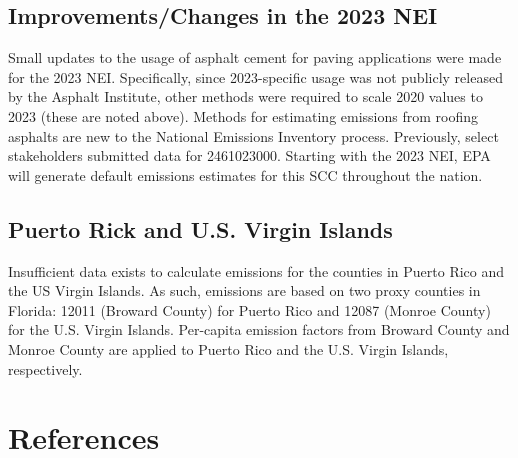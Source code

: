 \documentclass[
  11pt,
  oneside]{book}
\begin{document}
\subsection{Improvements/Changes in the 2023 NEI}\label{improvementschanges-in-the-2023-nei-1}

Small updates to the usage of asphalt cement for paving applications were made for the 2023 NEI. Specifically, since 2023-specific usage was not publicly released by the Asphalt Institute, other methods were required to scale 2020 values to 2023 (these are noted above). Methods for estimating emissions from roofing asphalts are new to the National Emissions Inventory process. Previously, select stakeholders submitted data for 2461023000. Starting with the 2023 NEI, EPA will generate default emissions estimates for this SCC throughout the nation.

\subsection{Puerto Rick and U.S. Virgin Islands}\label{puerto-rick-and-u.s.-virgin-islands-1}

Insufficient data exists to calculate emissions for the counties in Puerto Rico and the US Virgin Islands. As such, emissions are based on two proxy counties in Florida: 12011 (Broward County) for Puerto Rico and 12087 (Monroe County) for the U.S. Virgin Islands. Per-capita emission factors from Broward County and Monroe County are applied to Puerto Rico and the U.S. Virgin Islands, respectively.

\section{References}\label{asphalt-references}
\end{document}

